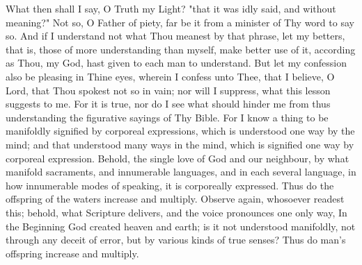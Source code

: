 \documentclass[b5paper,openright,12pt,twoside]{book}
\begin{document}
What then shall I say, O Truth my Light? "that it was idly said, and
without meaning?" Not so, O Father of piety, far be it from a minister
of Thy word to say so. And if I understand not what Thou meanest by
that phrase, let my betters, that is, those of more understanding than
myself, make better use of it, according as Thou, my God, hast given to
each man to understand. But let my confession also be pleasing in Thine
eyes, wherein I confess unto Thee, that I believe, O Lord, that Thou
spokest not so in vain; nor will I suppress, what this lesson suggests
to me. For it is true, nor do I see what should hinder me from thus
understanding the figurative sayings of Thy Bible. For I know a thing
to be manifoldly signified by corporeal expressions, which is understood
one way by the mind; and that understood many ways in the mind, which
is signified one way by corporeal expression. Behold, the single love
of God and our neighbour, by what manifold sacraments, and innumerable
languages, and in each several language, in how innumerable modes of
speaking, it is corporeally expressed. Thus do the offspring of the
waters increase and multiply. Observe again, whosoever readest this;
behold, what Scripture delivers, and the voice pronounces one only way,
In the Beginning God created heaven and earth; is it not understood
manifoldly, not through any deceit of error, but by various kinds of
true senses? Thus do man's offspring increase and multiply.
\end{document}
